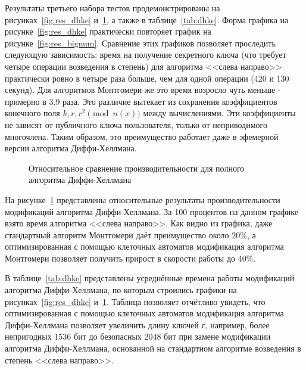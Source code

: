 \documentclass[times,specification,annotation]{itmo-student-thesis}
\begin{document}
Результаты третьего набора тестов продемонстрированы на рисунках~\ref{fig:res_dhke} и~\ref{fig:res_dhke_per},
а также в таблице~\ref{tab:dhke}.
Форма графика на рисунке~\ref{fig:res_dhke} практически повторяет график на рисунке~\ref{fig:res_bignum}.
Сравнение этих графиков позволяет проследить следующую зависимость: время на получение секретного ключа (что
требует четыре операции возведения в степень) для алгоритма <<слева направо>> практически ровно в четыре раза
больше, чем для одной операции (420 и 130 секунд).
Для алгоритмов Монтгомери же это время возросло чуть меньше - примерно в 3.9 раза.
Это различие вытекает из сохранения коэффициентов конечного поля $k, r, r^2 \pmod{n(x)}$ между вычислениями.
Эти коэффициенты не зависят от публичного ключа пользователя, только от неприводимого многочлена.
Таким образом, это преимущество работает даже в эфемерной версии алгоритма Диффи-Хеллмана.


\begin{figure}[!h]
\caption{Относительное сравнение производительности для полного алгоритма Диффи-Хеллмана}\label{fig:res_dhke_per}

\end{figure}

На рисунке~\ref{fig:res_dhke_per} представлены относительные результаты производительности модификаций алгоритма Диффи-Хеллмана.
За 100 процентов на данном графике взято время алгоритма <<слева направо>>.
Как видно из графика, даже стандартный алгоритм Монтгомери даёт преимущество около 20\%, а оптимизированная с помощью клеточных
автоматов модификация алгоритма Монтгомери позволяет получить прирост в скорости работы до 40\%.

В таблице~\ref{tab:dhke} представлены усреднённые времена работы модификаций алгоритма Диффи-Хеллмана, по которым
строились графики на рисунках~\ref{fig:res_dhke} и~\ref{fig:res_dhke_per}.
Таблица позволяет отчётливо увидеть, что оптимизированная с помощью клеточных автоматов модификация алгоритма
Диффи-Хеллмана позволяет увеличить длину ключей с, например, более непригодных 1536 бит до безопасных 2048 бит при замене
модификации алгоритма Диффи-Хеллмана, основанной на стандартном алгоритме возведения в степень <<слева направо>>.
\end{document}
